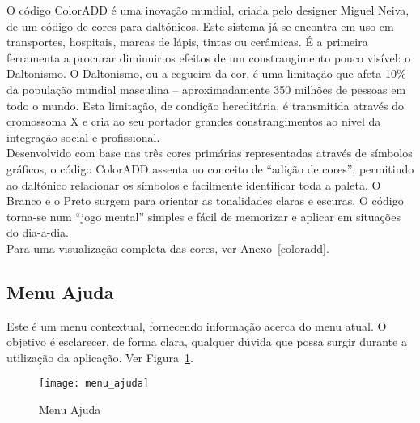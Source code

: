 O código ColorADD é uma inovação mundial, criada pelo designer Miguel Neiva, de um código de cores para daltónicos. Este sistema já se encontra em uso em transportes, hospitais, marcas de lápis, tintas ou cerâmicas. É a primeira ferramenta a procurar diminuir os efeitos de um constrangimento pouco visível: o Daltonismo. O Daltonismo, ou a cegueira da cor, é uma limitação que afeta 10\% da população mundial masculina – aproximadamente 350 milhões de pessoas em todo o mundo. Esta limitação, de condição hereditária, é transmitida através do cromossoma X e cria ao seu portador grandes constrangimentos ao nível da integração social e profissional.
\\Desenvolvido com base nas três cores primárias representadas através de símbolos gráficos, o código ColorADD assenta no conceito de “adição de cores”, permitindo ao daltónico relacionar os símbolos e facilmente identificar toda a paleta. O Branco e o Preto surgem para orientar as tonalidades claras e escuras. O código torna-se num “jogo mental” simples e fácil de memorizar e aplicar em situações do dia-a-dia. \cite{coloradd}
\\Para uma visualização completa das cores, ver Anexo~\ref{coloradd}.

\subsection{Menu Ajuda}

Este é um menu contextual, fornecendo informação acerca do menu atual. O objetivo é esclarecer, de forma clara, qualquer dúvida que possa surgir durante a utilização da aplicação. Ver Figura~\ref{fig:menu_ajuda}.

\begin{figure}[t]
  \begin{center}
    \leavevmode
    \texttt{[image: menu\_ajuda]}
    \caption{Menu Ajuda}
    \label{fig:menu_ajuda}
  \end{center}
\end{figure}